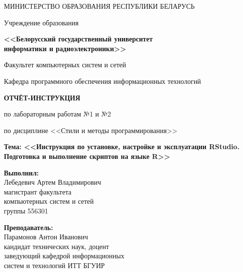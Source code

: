 \documentclass[14pt,a4paper]{extarticle}
\begin{document}
\thispagestyle{empty}
\begin{center}
МИНИСТЕРСТВО ОБРАЗОВАНИЯ РЕСПУБЛИКИ БЕЛАРУСЬ

\vspace{0.5em}

Учреждение образования

\textbf{<<Белорусский государственный университет\\информатики и радиоэлектроники>>}

\vspace{2em}

Факультет компьютерных систем и сетей

\vspace{0.5em}

Кафедра программного обеспечения информационных технологий
\end{center}

\vspace{4em}

\begin{center}
\textbf{ОТЧЁТ-ИНСТРУКЦИЯ}

\vspace{0.5em}

по лабораторным работам №1 и №2

\vspace{0.5em}

по дисциплине <<Стили и методы программирования>>

\vspace{1em}

\textbf{Тема: <<Инструкция по установке, настройке и эксплуатации RStudio. Подготовка и выполнение скриптов на языке R>>}
\end{center}

\vspace{5em}

\begin{flushright}
\begin{minipage}{0.5\textwidth}
\textbf{Выполнил:}\\
Лебедевич Артем Владимирович\\
магистрант факультета\\
компьютерных систем и сетей\\
группы 556301

\vspace{1em}

\textbf{Преподаватель:}\\
Парамонов Антон Иванович\\
кандидат технических наук, доцент\\
заведующий кафедрой информационных\\
систем и технологий ИТТ БГУИР
\end{minipage}
\end{flushright}
\end{document}
